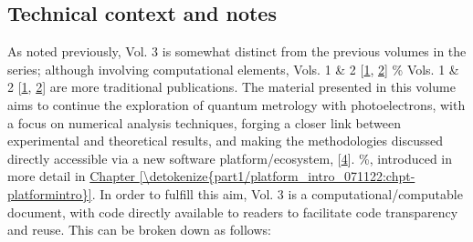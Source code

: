 \documentclass[letterpaper,table,10pt,english]{jupyterBook}
\begin{document}
\subsection{Technical context and notes}
\label{\detokenize{part1/main_intro_051122:technical-context-and-notes}}
\sphinxAtStartPar
As noted previously, Vol. 3 is somewhat distinct from the previous volumes in the series; although involving computational elements,  Vols. 1 \& 2 {[}\hyperlink{cite.backmatter/bibliography:id569}{1}, \hyperlink{cite.backmatter/bibliography:id570}{2}{]} \% Vols. 1 \& 2 {[}\hyperlink{cite.backmatter/bibliography:id569}{1}, \hyperlink{cite.backmatter/bibliography:id570}{2}{]}
are more traditional publications. The material presented in this volume aims to continue the exploration of quantum metrology with photoelectrons, with a focus on numerical analysis techniques, forging a closer link between experimental and theoretical results, and making the methodologies discussed directly accessible via a new software platform/ecosystem,  {[}\hyperlink{cite.backmatter/bibliography:id574}{4}{]}. \%, introduced in more detail in \hyperref[\detokenize{part1/platform_intro_071122:chpt-platformintro}]{Chapter \ref{\detokenize{part1/platform_intro_071122:chpt-platformintro}}}.
In order to fulfill this aim, Vol. 3 is a computational/computable document, with code directly available to readers to facilitate code transparency and reuse. This can be broken down as follows:
\end{document}
